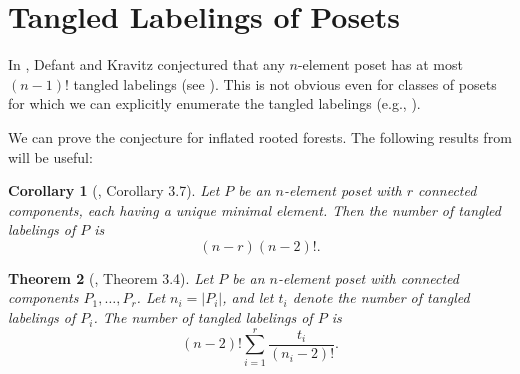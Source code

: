 \documentclass[11pt]{amsart}
\newtheorem{thm}{Theorem}[section]
\newtheorem{corollary}[thm]{Corollary}
\theoremstyle{definition}
\begin{document}
\section{Tangled Labelings of Posets}\label{Tangled}
In \cite{DK20}, Defant and Kravitz conjectured that any $ n $-element poset has at most $ (n-1)! $ tangled labelings (see ). This is not obvious even for classes of posets for which we can explicitly enumerate the tangled labelings (e.g., ).

We can prove the conjecture for inflated rooted forests. The following results from \cite{DK20} will be useful:
\begin{corollary}[\cite{DK20}, Corollary 3.7]\label{cor:tangled unique minimal element}
	Let $ P $ be an $ n $-element poset with $ r $ connected components, each having a unique minimal element. Then the number of tangled labelings of $ P $ is \[(n-r)(n-2)!.\]
\end{corollary}
\begin{thm}[\cite{DK20}, Theorem 3.4]
	Let $ P $ be an $ n $-element poset with connected components $ P_1,\ldots,P_r $. Let $ n_i=|P_i| $, and let $ t_i $ denote the number of tangled labelings of $ P_i $. The number of tangled labelings of $ P $ is \[(n-2)!\sum_{i=1}^r\frac{t_i}{(n_i-2)!}.\]
\end{thm}
\end{document}

